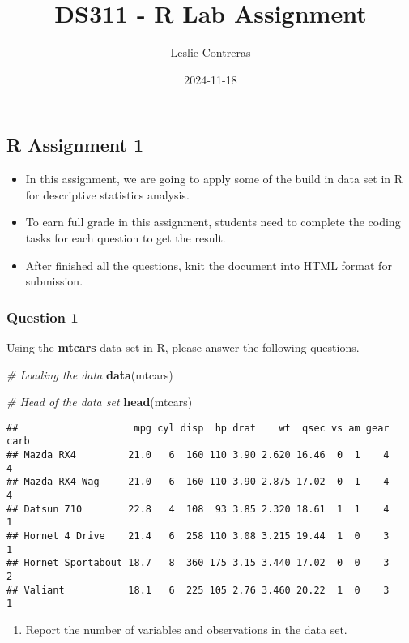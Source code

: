 \documentclass[
]{article}
\title{DS311 - R Lab Assignment}
\author{Leslie Contreras}
\date{2024-11-18}
\newenvironment{Shaded}{\begin{snugshade}}{\end{snugshade}}
\newcommand{\CommentTok}[1]{\textcolor[rgb]{0.56,0.35,0.01}{\textit{#1}}}
\newcommand{\FunctionTok}[1]{\textcolor[rgb]{0.13,0.29,0.53}{\textbf{#1}}}
\newcommand{\NormalTok}[1]{#1}
\providecommand{\tightlist}{%
  \setlength{\itemsep}{0pt}\setlength{\parskip}{0pt}}
\begin{document}
\maketitle

\subsection{R Assignment 1}\label{r-assignment-1}

\begin{itemize}
\tightlist
\item
  In this assignment, we are going to apply some of the build in data
  set in R for descriptive statistics analysis.
\item
  To earn full grade in this assignment, students need to complete the
  coding tasks for each question to get the result.
\item
  After finished all the questions, knit the document into HTML format
  for submission.
\end{itemize}

\subsubsection{Question 1}\label{question-1}

Using the \textbf{mtcars} data set in R, please answer the following
questions.

\begin{Shaded}
\begin{Highlighting}[]
\CommentTok{\# Loading the data}
\FunctionTok{data}\NormalTok{(mtcars)}

\CommentTok{\# Head of the data set}
\FunctionTok{head}\NormalTok{(mtcars)}
\end{Highlighting}
\end{Shaded}

\begin{verbatim}
##                    mpg cyl disp  hp drat    wt  qsec vs am gear carb
## Mazda RX4         21.0   6  160 110 3.90 2.620 16.46  0  1    4    4
## Mazda RX4 Wag     21.0   6  160 110 3.90 2.875 17.02  0  1    4    4
## Datsun 710        22.8   4  108  93 3.85 2.320 18.61  1  1    4    1
## Hornet 4 Drive    21.4   6  258 110 3.08 3.215 19.44  1  0    3    1
## Hornet Sportabout 18.7   8  360 175 3.15 3.440 17.02  0  0    3    2
## Valiant           18.1   6  225 105 2.76 3.460 20.22  1  0    3    1
\end{verbatim}

\begin{enumerate}
\def\labelenumi{\alph{enumi}.}
\tightlist
\item
  Report the number of variables and observations in the data set.
\end{enumerate}
\end{document}
